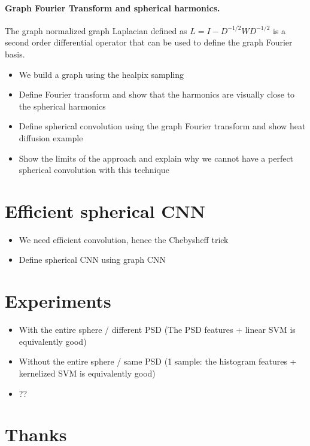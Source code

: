 \documentclass[preprint,12pt,authoryear]{elsarticle}
\newcommand{\assign}[1]{{\color[rgb]{.8,.5,.8}{Assigned: #1 }}}
\begin{document}
\paragraph{Graph Fourier Transform and spherical harmonics.}
The graph normalized graph Laplacian defined as $L = I - D^{-1/2} W D^{-1/2}$ is a second order differential operator that can be used to define the graph Fourier basis. 
 
\begin{itemize}
	\item We build a graph using the healpix sampling
	\item Define Fourier transform and show that the harmonics are visually close to the spherical harmonics
	\item Define spherical convolution using the graph Fourier transform and show heat diffusion example
	\item Show the limits of the approach and explain why we cannot have a perfect spherical convolution with this technique
\end{itemize}

\section{Efficient spherical CNN}
\assign{Michael}


\begin{itemize}
	\item We need efficient convolution, hence the Chebysheff trick
	\item Define spherical CNN using graph CNN
\end{itemize}

\section{Experiments}
\assign{Nathanael, Tomek}

\begin{itemize}
	\item With the entire sphere / different PSD (The PSD features + linear SVM is equivalently good)
	\item Without the entire sphere / same PSD (1 sample: the histogram features + kernelized SVM is equivalently good)
	\item ??
\end{itemize}


\section*{Thanks}
\end{document}
